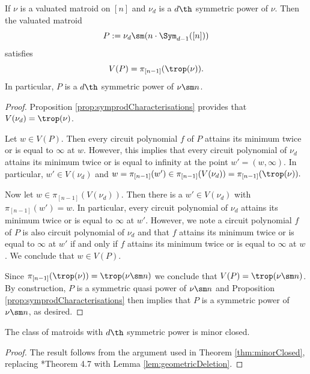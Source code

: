 \begin{lemma}\label{lem:geometricDeletion}
    If $\nu$ is a valuated matroid on $[n]$ and $\nu_d$ is a $d\th$ symmetric power of $\nu$. Then the valuated matroid
    $$P:=\nu_d\sm(n\cdot \Sym_{d-1}([n]))$$
    satisfies
    $$V(P) = \pi_{[n-1]}(\trop(\nu)).$$
    In particular, $P$ is a $d\th$ symmetric power of $\nu\sm n$.
\end{lemma}
\begin{proof}
Proposition \ref{prop:symprodCharacterisations} provides that $V(\nu_d)=\trop(\nu)$.

Let $w\in V(P)$. Then every circuit polynomial $f$ of $P$ attains its minimum twice or is equal to $\infty$ at $w$. However, this implies that every circuit polynomial of $\nu_d$ attains its minimum twice or is equal to infinity at the point $w'=(w,\infty).$ In particular, $w'\in V(\nu_d)$ and $w=\pi_{[n-1]}(w')\in \pi_{[n-1]}(V(\nu_d))=\pi_{[n-1]}(\trop(\nu)).$

Now let $w\in \pi_{[n-1]}(V(\nu_d))$. Then there is a $w' \in V(\nu_d)$ with $\pi_{[n-1]}(w')=w$. In particular, every circuit polynomial of $\nu_d$ attains its minimum twice or is equal to $\infty$ at $w'$. However, we note a circuit polynomial $f$ of $P$ is also circuit polynomial of $\nu_d$ and that $f$ attains its minimum twice or is equal to $\infty$ at $w'$ if and only if $f$ attains its minimum twice or is equal to $\infty$ at $w$. We conclude that $w\in V(P)$.

Since $\pi_{[n-1]}(\trop(\nu))=\trop(\nu\sm n)$ we conclude that $V(P)=\trop(\nu\sm n)$. By construction, $P$ is a symmetric quasi power of $\nu\sm n$ and Proposition \ref{prop:symprodCharacterisations} then implies that $P$ is a symmetric power of $\nu\sm n$, as desired.
\end{proof}

\begin{corollary}\label{cor:minorClosed}
    The class of matroids with $d\th$ symmetric power is minor closed.
\end{corollary}
\begin{proof}
    The result follows from the argument used in Theorem \ref{thm:minorClosed}, replacing \cite{MR20}*{Theorem 4.7} with Lemma \ref{lem:geometricDeletion}.
\end{proof}

